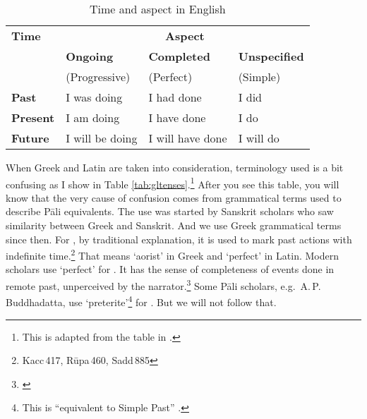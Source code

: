 \begin{table}[!hbt]
\centering
\caption{Time and aspect in English}
\label{tab:engaspect}
\bigskip
\begin{tabular}{@{}>{\bfseries}llll@{}} \toprule
Time & \multicolumn{3}{c}{\bfseries Aspect} \\
\cmidrule{2-4}
& \bfseries Ongoing & \bfseries Completed & \bfseries Unspecified \\
& (Progressive) & (Perfect) & (Simple) \\
\midrule
Past & I was doing & I had done & I did \\
Present & I am doing & I have done & I do \\
Future & I will be doing & I will have done & I will do \\
\bottomrule
\end{tabular}
\end{table}

When Greek and Latin are taken into consideration, terminology used is a bit confusing as I show in Table \ref{tab:gltenses}.\footnote{This is adapted from the table in \citealp[p.~123]{fairbairn:understanding}.} After you see this table, you will know that the very cause of confusion comes from grammatical terms used to describe P\=ali equivalents. The use was started by Sanskrit scholars who saw similarity between Greek and Sanskrit. And we use Greek grammatical terms since then. For , by traditional explanation, it is used to mark past actions with indefinite time.\footnote{Kacc\,417, R\=upa\,460, Sadd\,885} That means `aorist' in Greek and `perfect' in Latin. Modern scholars use `perfect' for . It has the sense of completeness of events done in remote past, unperceived by the narrator.\footnote{\citealp[p.~134]{williams:grammar}} Some P\=ali scholars, e.g.\ A.\,P.\,Buddhadatta, use `preterite'\footnote{This is ``equivalent to Simple Past'' \citep[p.~357]{brownmiller:dict}.} for . But we will not follow that.

